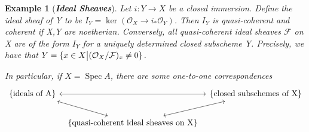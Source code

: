 \documentclass{ctexart}
\newtheorem{example}{Example}[section]
\newcommand{\spec}{\operatorname{Spec}}
\begin{document}
\begin{example}[\textbf{\emph{Ideal Sheaves}}]
    Let $i: Y \longrightarrow X$ be a closed immersion.
    Define the ideal sheaf of Y to be $I_{Y} = \ker(\mathcal{O}_{X} \longrightarrow i_{\ast}\mathcal{O}_{Y})$.
    Then $I_{Y}$ is quasi-coherent and coherent if X,Y are noetherian.
    Conversely, all quasi-coherent ideal sheaves $\mathcal{F}$ on X are of the form $I_{Y}$ for a uniquely determined closed subscheme Y.
    Precisely, we have that $Y = \{x\in X \big{|} (\mathcal{O}_{X}/\mathcal{F})_{x} \neq 0\}$.
    \par
    In particular, if $X = \spec A$, there are some one-to-one correspondences
    \begin{equation*}
        \begin{tikzcd}[column sep= tiny]
            \{\text{ideals of A}\} \arrow[rr, leftrightarrow] \arrow[dr, leftrightarrow] &&
            \{\text{closed subschemes of X}\} \\
            & \{\text{quasi-coherent ideal sheaves on X}\} \arrow[ur, leftrightarrow] &
        \end{tikzcd}
    \end{equation*}
\end{example}
\end{document}
